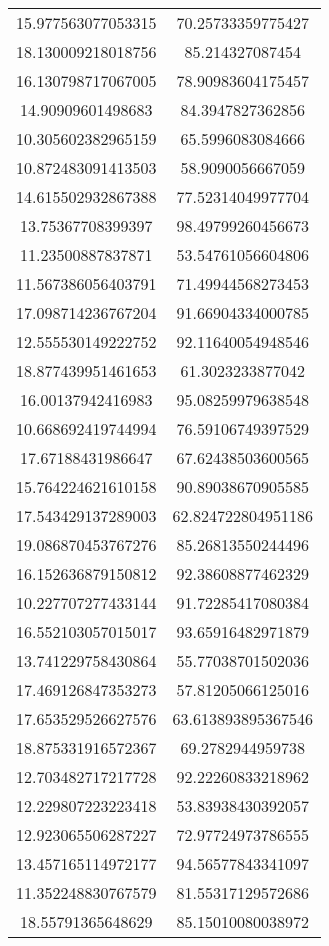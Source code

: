 \begin{table}
\begin{tabular}{cc}
15.977563077053315 & 70.25733359775427 \\
18.130009218018756 & 85.214327087454 \\
16.130798717067005 & 78.90983604175457 \\
14.90909601498683 & 84.3947827362856 \\
10.305602382965159 & 65.5996083084666 \\
10.872483091413503 & 58.9090056667059 \\
14.615502932867388 & 77.52314049977704 \\
13.75367708399397 & 98.49799260456673 \\
11.23500887837871 & 53.54761056604806 \\
11.567386056403791 & 71.49944568273453 \\
17.098714236767204 & 91.66904334000785 \\
12.555530149222752 & 92.11640054948546 \\
18.877439951461653 & 61.3023233877042 \\
16.00137942416983 & 95.08259979638548 \\
10.668692419744994 & 76.59106749397529 \\
17.67188431986647 & 67.62438503600565 \\
15.764224621610158 & 90.89038670905585 \\
17.543429137289003 & 62.824722804951186 \\
19.086870453767276 & 85.26813550244496 \\
16.152636879150812 & 92.38608877462329 \\
10.227707277433144 & 91.72285417080384 \\
16.552103057015017 & 93.65916482971879 \\
13.741229758430864 & 55.77038701502036 \\
17.469126847353273 & 57.81205066125016 \\
17.653529526627576 & 63.613893895367546 \\
18.875331916572367 & 69.2782944959738 \\
12.703482717217728 & 92.22260833218962 \\
12.229807223223418 & 53.83938430392057 \\
12.923065506287227 & 72.97724973786555 \\
13.457165114972177 & 94.56577843341097 \\
11.352248830767579 & 81.55317129572686 \\
18.55791365648629 & 85.15010080038972 \\

\end{tabular}
\end{table}
